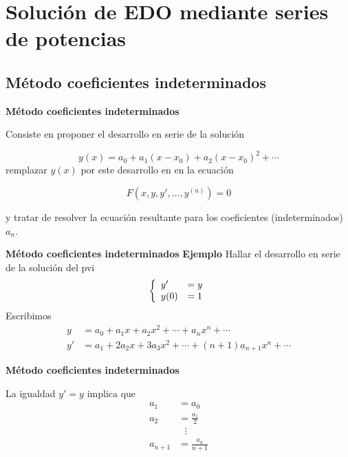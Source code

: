 



\section{Solución de EDO mediante series de potencias}



\subsection{Método coeficientes indeterminados}

 \begin{frame}{\textbf{Método coeficientes indeterminados}}


Consiste en proponer el desarrollo en serie de la solución

\[y(x)=a_0+a_1(x-x_0)+a_2(x-x_0)^2+\cdots  \]
remplazar $y(x)$ por este desarrollo en  en la ecuación 



\begin{equation}  F(x,y,y',\ldots,y^{(n)})=0\end{equation}


 y tratar de resolver la ecuación resultante para los coeficientes (indeterminados) $a_n$.
\end{frame}

 \begin{frame}{\textbf{Método coeficientes indeterminados}}
\textbf{Ejemplo } Hallar el desarrollo en serie de la solución del  pvi
\[\left\{\begin{array}{l l} y'&=y\\ y(0)&=1\end{array}\right.\]
 Escribimos
\[\begin{split}
   y&=a_0+a_1x+a_2x^2+\cdots+a_nx^n+\cdots\\
   y'&=a_1+2a_2x+3a_3x^2+\cdots+(n+1)a_{n+1}x^n+\cdots
  \end{split}
\]
\end{frame}

 \begin{frame}{\textbf{Método coeficientes indeterminados}}

La igualdad $y'=y$ implica que
\[\begin{split}
   a_1&=a_0\\
   a_2&=\frac{a_1}{2}\\
      &\,\,\,\,\vdots \\
   a_{n+1}&=\frac{a_{n}}{n+1}
 \end{split}
\]


\end{frame}

